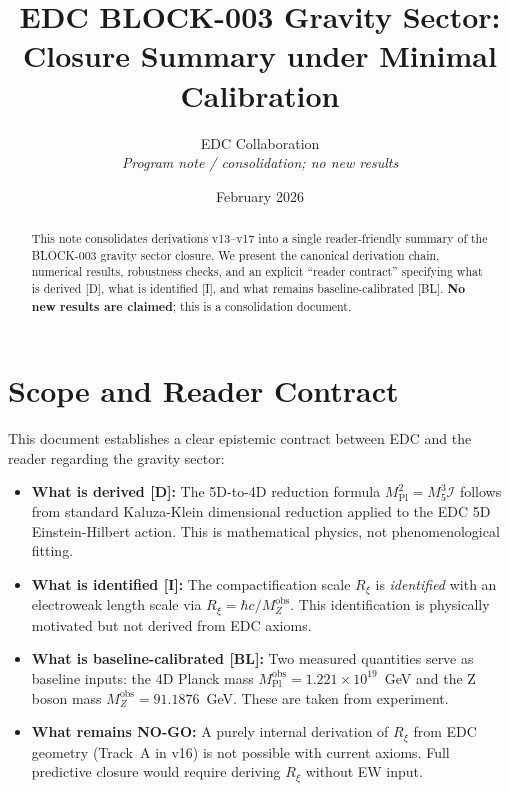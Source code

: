 \documentclass[11pt,a4paper]{article}
\title{EDC BLOCK-003 Gravity Sector:\\
Closure Summary under Minimal Calibration}
\author{EDC Collaboration\\[3pt]
\small\textit{Program note / consolidation; no new results}}
\date{February 2026}
\newcommand{\Rxi}{R_\xi}
\newcommand{\Mpl}{M_{\mathrm{Pl}}}
\newcommand{\Mfive}{M_5}
\newcommand{\MZ}{M_Z}
\newcommand{\calI}{\mathcal{I}}
\begin{document}
\maketitle

\begin{abstract}
This note consolidates derivations v13--v17 into a single reader-friendly summary
of the BLOCK-003 gravity sector closure. We present the canonical derivation chain,
numerical results, robustness checks, and an explicit ``reader contract'' specifying
what is derived [D], what is identified [I], and what remains baseline-calibrated [BL].
\textbf{No new results are claimed}; this is a consolidation document.
\end{abstract}

\section{Scope and Reader Contract}

This document establishes a clear epistemic contract between EDC and the reader
regarding the gravity sector:

\begin{itemize}
\item \textbf{What is derived [D]:}
The 5D-to-4D reduction formula $\Mpl^2 = \Mfive^3 \calI$ follows from standard
Kaluza-Klein dimensional reduction applied to the EDC 5D Einstein-Hilbert action.
This is mathematical physics, not phenomenological fitting.

\item \textbf{What is identified [I]:}
The compactification scale $\Rxi$ is \emph{identified} with an electroweak length
scale via $\Rxi = \hbar c / \MZ^{\mathrm{obs}}$. This identification is physically
motivated but not derived from EDC axioms.

\item \textbf{What is baseline-calibrated [BL]:}
Two measured quantities serve as baseline inputs: the 4D Planck mass
$\Mpl^{\mathrm{obs}} = 1.221 \times 10^{19}$~GeV and the Z boson mass
$\MZ^{\mathrm{obs}} = 91.1876$~GeV. These are taken from experiment.

\item \textbf{What remains NO-GO:}
A purely internal derivation of $\Rxi$ from EDC geometry (Track~A in v16) is
not possible with current axioms. Full predictive closure would require deriving
$\Rxi$ without EW input.
\end{itemize}
\end{document}
